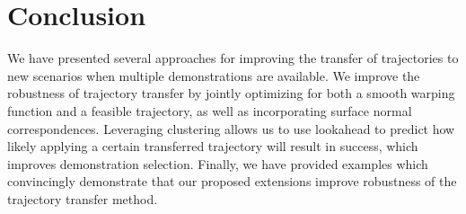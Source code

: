 \documentclass{article}
\begin{document}
\section{Conclusion}

We have presented several approaches for improving the transfer of trajectories to new scenarios when multiple demonstrations are available. We improve the robustness of trajectory transfer by jointly optimizing for both a smooth warping function and a feasible trajectory, as well as incorporating surface normal correspondences. Leveraging clustering allows us to use lookahead to predict how likely applying a certain transferred trajectory will result in success, which improves demonstration selection. Finally, we have provided examples which convincingly demonstrate that our proposed extensions improve robustness of the trajectory transfer method.



\end{document}
